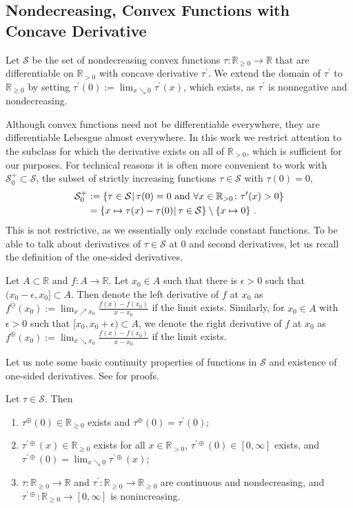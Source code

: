 \documentclass{article}
\newcommand*{\mc}[1]{\mathcal{#1}}
\newcommand{\R}{\mathbb{R}}
\newcommand{\Rp}{\R_{\geq0}}
\newcommand{\Rpp}{\R_{>0}}
\newcommand{\lcb}{\left\lbrace} %
\newcommand{\rcb}{\right\rbrace} %
\newcommand{\cb}[1]{\lcb #1 \rcb} %
\newcommand{\sizedMid}[2]{#1 \, \kern-\nulldelimiterspace\mathopen{}\left| \vphantom{#1}\,#2\right.\mathclose{}\kern-\nulldelimiterspace}
\newcommand{\setByEle}[2]{\cb{\sizedMid{#1}{#2}}}
\newcommand{\pr}{^\prime}
\newcommand{\eqfs}{\,.}
\newcommand{\tran}{\tau}
\newcommand{\dtran}{\tau\pr}
\newcommand{\ddrtran}{\tau^{\prime\oplus}}
\newcommand{\setcc}{\mc S}
\newcommand{\setcciz}{\mc S_0^+}
\newcommand{\ld}{^\ominus}
\newcommand{\rd}{^\oplus}
\begin{document}
\subsection{Nondecreasing, Convex Functions with Concave Derivative}\label{sec:ncfcd}
%
\begin{definition}\label{def:tran}
    Let $\setcc$ be the set of nondecreasing convex functions $\tran\colon\Rp\to\R$ that are differentiable on $\Rpp$ with concave derivative $\dtran$. We extend the domain of $\dtran$ to $\Rp$ by setting  $\dtran(0) := \lim_{x\searrow0} \dtran(x)$, which exists, as $\dtran$ is nonnegative and nondecreasing.
\end{definition}
%
Although convex functions need not be differentiable everywhere, they are differentiable Lebesgue almost everywhere. In this work we restrict attention to the subclass for which the derivative exists on all of $\Rpp$, which is sufficient for our purposes.
For technical reasons it is often more convenient to work with $\setcciz\subset\setcc$, the subset of strictly increasing functions $\tran\in\setcc$ with $\tran(0) = 0$,
\begin{align}
    \setcciz
    &:=
    \setByEle{\tran\in\setcc}{\tran(0) = 0 \text{ and } \forall x\in\Rpp\colon \dtran(x)>0}
    \\&=
    \setByEle{x \mapsto \tran(x)-\tran(0)}{\tran\in\setcc}\setminus\cb{x\mapsto 0}
    \eqfs
\end{align}
This is not restrictive, as we essentially only exclude constant functions.
To be able to talk about derivatives of $\tran\in\setcc$ at $0$ and second derivatives, let us recall the definition of the one-sided derivatives.
%
\begin{notation}\label{nota:leftrightderiv}
    Let $A\subset \R$ and $f\colon A \to \R$. Let $x_0\in A$ such that there is $\epsilon>0$ such that $(x_0-\epsilon, x_0] \subset A$. Then denote the left derivative of $f$ at $x_0$ as $f\ld(x_0) := \lim_{x \nearrow x_0} \frac{f(x) - f(x_0)}{x-x_0}$ if the limit exists. Similarly, for $x_0\in A$ with $\epsilon>0$ such that $[x_0, x_0+\epsilon) \subset A$, we denote the right derivative of $f$ at $x_0$ as $f\rd(x_0) := \lim_{x \searrow x_0} \frac{f(x) - f(x_0)}{x-x_0}$ if the limit exists.
\end{notation}
%
Let us note some basic continuity properties of functions in $\setcc$ and existence of one-sided derivatives. See \cite{varinequ} for proofs.
%
\begin{lemma}\label{lmm:tran:continuous}
    Let $\tran\in\setcc$. Then
    \begin{enumerate}[label=(\roman*)]
        \item $\tran\rd(0)\in \Rp$ exists and $\tran\rd(0) = \dtran(0)$;
        \item $\ddrtran(x) \in \Rp$ exists for all $x\in\Rpp$, $\ddrtran(0) \in [0,\infty]$ exists, and $\ddrtran(0) = \lim_{x\searrow0} \ddrtran(x)$;
		\item $\tran\colon\Rp\to\R$ and $\dtran\colon\Rp\to\Rp$ are continuous and nondecreasing, and $\ddrtran\colon\Rp\to[0,\infty]$ is nonincreasing.
    \end{enumerate}
\end{lemma}
\end{document}
